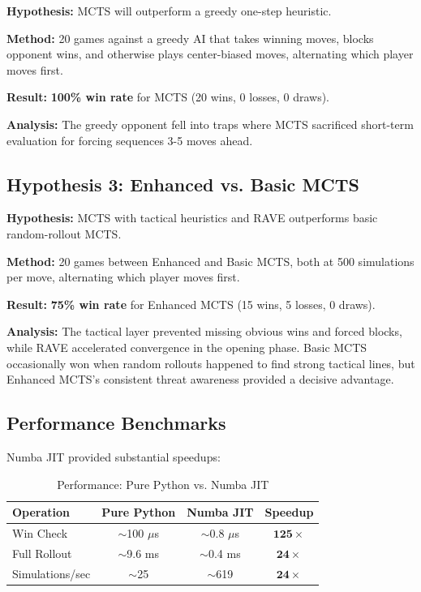 \documentclass[11pt]{article}
\begin{document}
\textbf{Hypothesis:} MCTS will outperform a greedy one-step heuristic.

\textbf{Method:} 20 games against a greedy AI that takes winning moves, blocks opponent wins, and otherwise plays center-biased moves, alternating which player moves first.

\textbf{Result:} \textbf{100\% win rate} for MCTS (20 wins, 0 losses, 0 draws).

\textbf{Analysis:} The greedy opponent fell into traps where MCTS sacrificed short-term evaluation for forcing sequences 3-5 moves ahead.

\subsection{Hypothesis 3: Enhanced vs. Basic MCTS}

\textbf{Hypothesis:} MCTS with tactical heuristics and RAVE outperforms basic random-rollout MCTS.

\textbf{Method:} 20 games between Enhanced and Basic MCTS, both at 500 simulations per move, alternating which player moves first.

\textbf{Result:} \textbf{75\% win rate} for Enhanced MCTS (15 wins, 5 losses, 0 draws).

\textbf{Analysis:} The tactical layer prevented missing obvious wins and forced blocks, while RAVE accelerated convergence in the opening phase. Basic MCTS occasionally won when random rollouts happened to find strong tactical lines, but Enhanced MCTS's consistent threat awareness provided a decisive advantage.

\subsection{Performance Benchmarks}

Numba JIT provided substantial speedups:

\begin{table}[H]
\centering
\caption{Performance: Pure Python vs. Numba JIT}
\begin{tabular}{lccc}
\toprule
\textbf{Operation} & \textbf{Pure Python} & \textbf{Numba JIT} & \textbf{Speedup} \\
\midrule
Win Check & $\sim$100 $\mu$s & $\sim$0.8 $\mu$s & $\mathbf{125\times}$ \\
Full Rollout & $\sim$9.6 ms & $\sim$0.4 ms & $\mathbf{24\times}$ \\
Simulations/sec & $\sim$25 & $\sim$619 & $\mathbf{24\times}$ \\
\bottomrule
\end{tabular}
\end{table}
\end{document}
